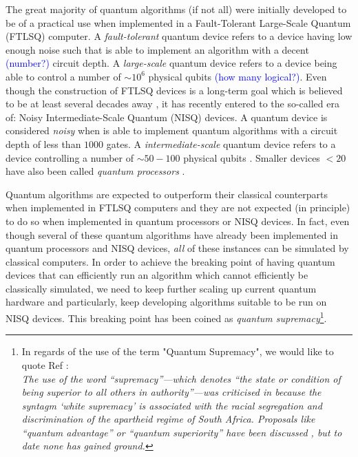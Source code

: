 
The great majority of quantum algorithms (if not all) were initially developed to be of a practical use when implemented in a Fault-Tolerant Large-Scale Quantum (FTLSQ) computer. A \emph{fault-tolerant} quantum device refers to a device having low enough noise such that is able to implement an algorithm with a decent \textcolor{blue}{(number?)} circuit depth. A \emph{large-scale} quantum device refers to a device being able to control a number of $\sim 10^6$ physical qubits \textcolor{blue}{(how many logical?)}. Even though the construction of FTLSQ devices is a long-term goal which is believed to be at least several decades away \cite{JLOqc2010}, it has recently entered to the so-called era of: Noisy Intermediate-Scale Quantum (NISQ) devices. A quantum device is considered \emph{noisy} when is able to implement quantum algorithms with a circuit depth of less than $1000$ gates. A \emph{intermediate-scale} quantum device refers to a device controlling a number of $\sim 50-100$ physical qubits \cite{Preskill2018}. Smaller devices $< 20$ have also been called \emph{quantum processors} \cite{Qiang2018}. %

Quantum algorithms are expected to outperform their classical counterparts when implemented in FTLSQ computers and they are not expected (in principle) to do so when implemented in quantum processors or NISQ devices. In fact, even though several of these quantum algorithms have already been implemented in quantum processors and NISQ devices, \emph{all} of these instances can be simulated by classical computers. In order to achieve the breaking point of having quantum devices that can efficiently run an algorithm which cannot efficiently be classically simulated, we need to keep further scaling up current quantum hardware and particularly, keep developing algorithms suitable to be run on NISQ devices. This breaking point has been coined as \emph{quantum supremacy}\footnote{In regards of the use of the term "Quantum Supremacy", we would like to quote Ref \cite{Road2017}:\\ \emph{The use of the word “supremacy”—which denotes “the state or condition of being superior to all others in authority”—was criticised in \cite{Road52107} because the syntagm ‘white supremacy’ is associated with the racial segregation and discrimination of the apartheid regime of South Africa. Proposals like “quantum advantage” or “quantum superiority” have been discussed \cite{Road42017}, but to date none has gained ground.}}. 

